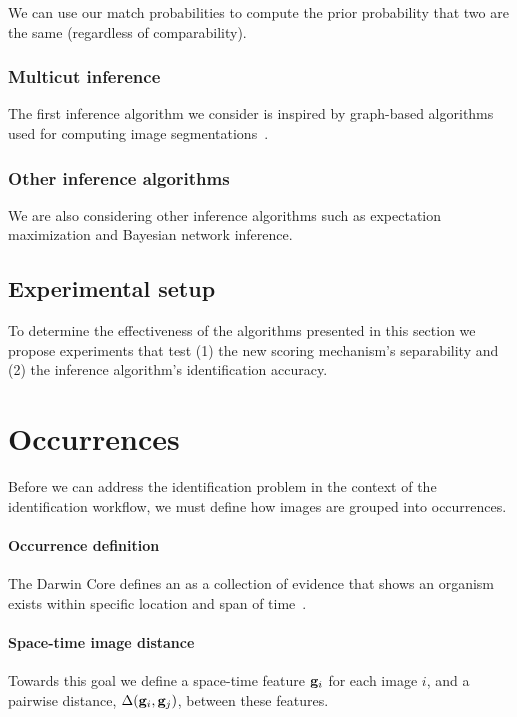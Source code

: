             We can use our match probabilities to compute the prior probability that two \annots{} are the same
              (regardless of comparability).
        \subsubsection{Multicut inference}
            The first inference algorithm we consider is inspired by graph-based algorithms used for computing image
              segmentations~\cite{kappes_globally_2011, kappes_higherorder_2016}.
        \subsubsection{Other inference algorithms}
            We are also considering other inference algorithms such as expectation maximization and Bayesian network
              inference.
            
    \subsection{Experimental setup}
        To determine the effectiveness of the algorithms presented in this section we propose experiments that test
        (1) the new scoring mechanism's separability and
        (2) the inference algorithm's identification accuracy.
        
\section{Occurrences}
    Before we can address the identification problem in the context of the identification workflow, we must define how
      images are grouped into occurrences.
    
    \paragraph{Occurrence definition}
    The Darwin Core defines an \occurrence{} as a collection of evidence that shows an organism exists within specific
      location and span of time~\cite{wieczorek_darwin_2012}.
    
    \paragraph{Space-time image distance}
    Towards this goal we define a space-time feature $\mathbf{g}_i$ for each image $i$, and a pairwise distance, $\Delta(\mathbf{g}_i,
      \mathbf{g}_j)$, between these features.
    
